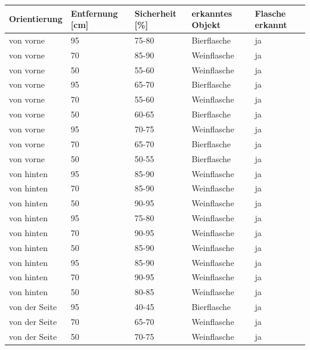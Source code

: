 \begin{table} [H]
	\centering
	\begin{tabular} {l l l l l}
		Orientierung & Entfernung [cm] & Sicherheit [\%] & erkanntes Objekt & Flasche erkannt\\ \hline
		von vorne&	95&	75-80&	Bierflasche\cellcolor{green}&ja\cellcolor{green}\\
		von vorne&	70&	85-90&	Weinflasche\cellcolor{red}&ja\cellcolor{green}\\
		von vorne&	50&	55-60&	Weinflasche\cellcolor{red}&ja\cellcolor{green}\\
		von vorne&	95&	65-70&	Bierflasche\cellcolor{green}&ja\cellcolor{green}\\
		von vorne&	70&	55-60&	Weinflasche\cellcolor{red}&ja\cellcolor{green}\\
		von vorne&	50&	60-65&	Bierflasche\cellcolor{green}&ja\cellcolor{green}\\
		von vorne&	95&	70-75&	Weinflasche\cellcolor{red}&ja\cellcolor{green}\\
		von vorne&	70&	65-70&	Bierflasche\cellcolor{green}&ja\cellcolor{green}\\
		von vorne&	50&	50-55&	Bierflasche\cellcolor{green}&ja\cellcolor{green}\\ \hline
		von hinten&	95&	85-90&	Weinflasche\cellcolor{red}&ja\cellcolor{green}\\
		von hinten&	70&	85-90&	Weinflasche\cellcolor{red}&ja\cellcolor{green}\\
		von hinten&	50&	90-95&	Weinflasche\cellcolor{red}&ja\cellcolor{green}\\
		von hinten&	95&	75-80&	Weinflasche\cellcolor{red}&ja\cellcolor{green}\\
		von hinten&	70&	90-95&	Weinflasche\cellcolor{red}&ja\cellcolor{green}\\
		von hinten&	50&	85-90&	Weinflasche\cellcolor{red}&ja\cellcolor{green}\\
		von hinten&	95&	85-90&	Weinflasche\cellcolor{red}&ja\cellcolor{green}\\
		von hinten&	70&	90-95&	Weinflasche\cellcolor{red}&ja\cellcolor{green}\\
		von hinten&	50&	80-85&	Weinflasche\cellcolor{red}&ja\cellcolor{green}\\ \hline
		von der Seite&	95&	40-45&	Bierflasche\cellcolor{green}&ja\cellcolor{green}\\
		von der Seite&	70&	65-70&	Weinflasche\cellcolor{red}&ja\cellcolor{green}\\
		von der Seite&	50&	70-75&	Weinflasche\cellcolor{red}&ja\cellcolor{green}\\

\end{tabular}
\end{table}
